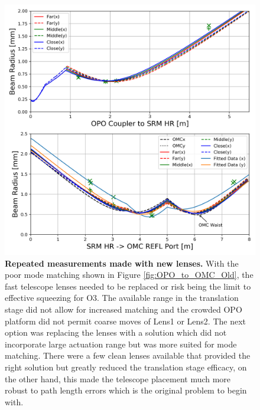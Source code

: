 	\begin{figure}[t!]
	\centering
	\includegraphics[width=0.8 \textwidth]{../Figures/OPO_to_OMCREFL_Newlenses.png}
	\caption[Repeated measurements made with new lenses.]  
	{\textbf{Repeated measurements made with new lenses.}
		With the poor mode matching shown in Figure \ref{fig:OPO_to_OMC_Old}, the fast telescope lenses needed to be replaced or risk being the limit to effective squeezing for O3.  The available range in the translation stage did not allow for increased matching and the crowded OPO platform did not permit coarse moves of Lens1 or Lens2.  The next option was replacing the lenses with a solution which did not incorporate large actuation range but was more suited for mode matching.  There were a few clean lenses available that provided the right solution but greatly reduced the translation stage efficacy, on the other hand, this made the telescope placement much more robust to path length errors which is the original problem to begin with.
	}
	\label{fig:OPO_to_OMC_New}
	\end{figure}
	
